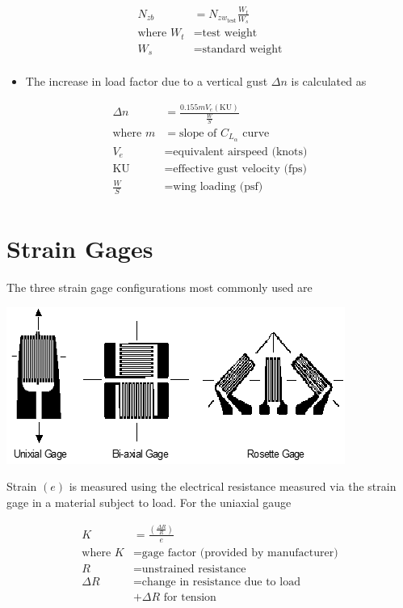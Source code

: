 \documentclass[
]{book}
\providecommand{\tightlist}{%
  \setlength{\itemsep}{0pt}\setlength{\parskip}{0pt}}
\begin{document}
\[
  \begin{align}
  N_{zb} &= N_{zw_{\text{test}}} \frac{W_t}{W_s} \\
  \text{where } W_t &= \text{test weight} \\
  W_s &= \text{standard weight} \\
  \end{align}
\]

\begin{itemize}
\tightlist
\item
  The increase in load factor due to a vertical gust \(\Delta n\) is calculated as
\end{itemize}

\[
  \begin{align}
  \Delta n &= \frac{0.155 m V_e \left( \mathrm{KU} \right) }{\frac{W}{S}} \\
  \text{where } m &= \text{slope of } C_{L_{\alpha}} \text{ curve} \\
  V_e &= \text{equivalent airspeed (knots)} \\
  \mathrm{KU} &= \text{effective gust velocity (fps)} \\
  \frac{W}{S} &= \text{wing loading (psf)} \\
  \end{align}
\]

\hypertarget{strain-gages}{%
\section{Strain Gages}\label{strain-gages}}

The three strain gage configurations most commonly used are

\includegraphics[width=4.36389in,height=2.02083in]{media/09/image4.png}

Strain \(\left( e \right)\) is measured using the electrical resistance measured via the strain gage in a material subject to load. For the uniaxial gauge

\[
  \begin{align}
  K &= \frac{ \left( \frac{\Delta R}{R} \right) }{e} \\
  \text{where } K &= \text{gage factor (provided by manufacturer)} \\
  R &= \text{unstrained resistance} \\
  \Delta R &= \text{change in resistance due to load} \\
  & + \Delta R \text{ for tension} \\
  \end{align}
\]
\end{document}
